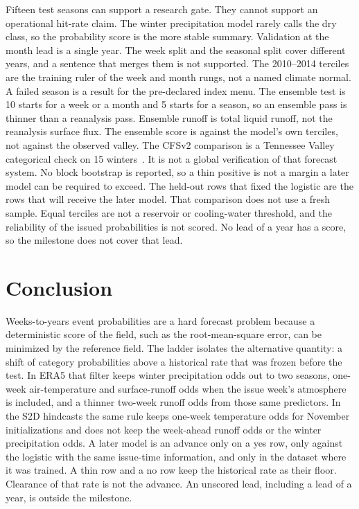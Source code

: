 \documentclass{ametsocV6.2}
\begin{document}
Fifteen test seasons can support a research gate.
They cannot support an operational hit-rate claim.
The winter precipitation model rarely calls the dry class, so the probability score is the more stable summary.
Validation at the month lead is a single year.
The week split and the seasonal split cover different years, and a sentence that merges them is not supported.
The 2010--2014 terciles are the training ruler of the week and month rungs, not a named climate normal.
A failed season is a result for the pre-declared index menu.
The ensemble test is 10 starts for a week or a month and 5 starts for a season, so an ensemble pass is thinner than a reanalysis pass.
Ensemble runoff is total liquid runoff, not the reanalysis surface flux.
The ensemble score is against the model's own terciles, not against the observed valley.
The CFSv2 comparison is a Tennessee Valley categorical check on 15 winters~\citep{barnston2012cfsv2}.
It is not a global verification of that forecast system.
No block bootstrap is reported, so a thin positive is not a margin a later model can be required to exceed.
The held-out rows that fixed the logistic are the rows that will receive the later model.
That comparison does not use a fresh sample.
Equal terciles are not a reservoir or cooling-water threshold, and the reliability of the issued probabilities is not scored.
No lead of a year has a score, so the milestone does not cover that lead.

\section{Conclusion}
\label{sec:conc}

Weeks-to-years event probabilities are a hard forecast problem because a deterministic score of the field, such as the root-mean-square error, can be minimized by the reference field.
The ladder isolates the alternative quantity: a shift of category probabilities above a historical rate that was frozen before the test.
In ERA5 that filter keeps winter precipitation odds out to two seasons, one-week air-temperature and surface-runoff odds when the issue week's atmosphere is included, and a thinner two-week runoff odds from those same predictors.
In the S2D hindcasts the same rule keeps one-week temperature odds for November initializations and does not keep the week-ahead runoff odds or the winter precipitation odds.
A later model is an advance only on a yes row, only against the logistic with the same issue-time information, and only in the dataset where it was trained.
A thin row and a no row keep the historical rate as their floor.
Clearance of that rate is not the advance.
An unscored lead, including a lead of a year, is outside the milestone.
\end{document}
